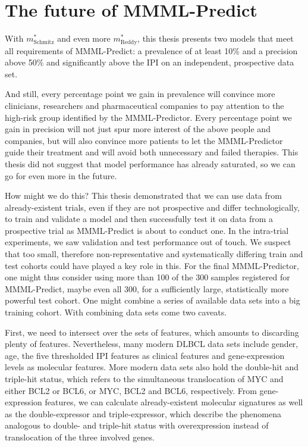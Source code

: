 \section{The future of MMML-Predict}\label{subsec:discussion-mmml}

With $m^*_\text{Schmitz}$ and even more $m^*_\text{Reddy}$, this thesis presents two 
models that meet all requirements of MMML-Predict: a prevalence of at least \num{10}\% and a 
precision above \num{50}\% and significantly above the IPI on an independent, prospective data set. 

And still, every percentage point we gain in prevalence will convince more clinicians, researchers 
and pharmaceutical companies to pay attention to the high-risk group identified by the MMML-Predictor.
Every percentage point we gain in precision will not just spur more interest of the above people and 
companies, but will also convince more patients to let the MMML-Predictor guide their treatment and 
will avoid both unnecessary and failed therapies. This thesis did not suggest that model performance 
has already saturated, so we can go for even more in the future.

How might we do this? This thesis demonstrated that we can use data from already-existent trials, 
even if they are not prospective and differ technologically, to train and validate a model and 
then successfully test it on data from a prospective trial as MMML-Predict is about to conduct one.
In the intra-trial experiments, we saw validation and test performance out of touch. We suspect 
that too small, therefore non-representative and systematically differing train and test cohorts 
could have played a key role in this. For the final MMML-Predictor, one might thus consider 
using more than \num{100} of the \num{300} samples registered for MMML-Predict, maybe even all 
\num{300}, for a sufficiently large, statistically more powerful test cohort. One might combine 
a series of available data sets into a big training cohort. With combining data sets come two 
caveats. 

First, we need to intersect over the sets of features, which amounts to discarding plenty 
of features. Nevertheless, many modern DLBCL data sets include gender, age, the five thresholded 
IPI features as clinical features and gene-expression levels as molecular features. More modern data 
sets also hold the double-hit and triple-hit status, which refers to the simultaneous translocation 
of MYC and either BCL2 or BCL6, or MYC, BCL2 and BCL6, respectively. From gene-expression 
features, we can calculate already-existent molecular signatures as well as the double-expressor and 
triple-expressor, which describe the phenomena analogous to double- and triple-hit status with 
overexpression instead of translocation of the three involved genes.

